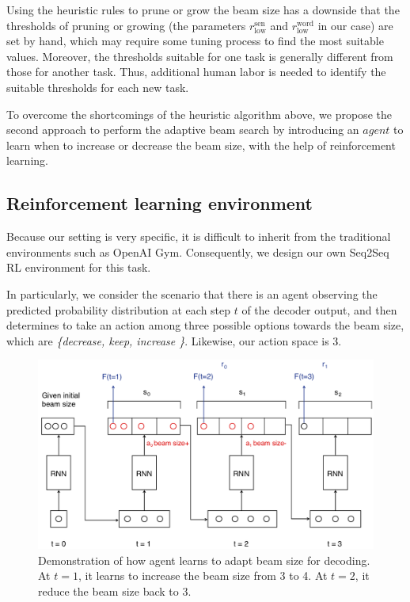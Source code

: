 \documentclass[11pt,a4paper]{article}
\begin{document}
Using the heuristic rules to prune or grow the beam size has a downside that the thresholds of pruning or growing (the parameters $r^{\textrm{sen}}_{\textrm{low}}$ and $r^{\textrm{word}}_{\textrm{low}}$ in our case) are set by hand, which may require some tuning process to find the most suitable values. Moreover, the thresholds suitable for one task is generally different from those for another task. Thus, additional human labor is needed to identify the suitable thresholds for each new task.

To overcome the shortcomings of the heuristic algorithm above, we propose the second approach to perform the adaptive beam search by introducing an $agent$ to learn when to increase or decrease the beam size, with the help of reinforcement learning.

\subsection{Reinforcement learning environment}
Because our setting is very specific, it is difficult to inherit from the traditional environments such as OpenAI Gym. Consequently, we design our own Seq2Seq RL environment for this task. 

In particularly, we consider the scenario that there is an agent observing the predicted probability distribution at each step $t$ of the decoder output, and then determines to take an action among three possible options towards the beam size, which are \textit{\{decrease, keep, increase \}}. Likewise, our action space is 3. 


\begin{figure}[ht]
\centering
\includegraphics[width=1.0\linewidth]{adapt.png}
\caption{Demonstration of how agent learns to adapt beam size for decoding. At $t=1$, it learns to increase the beam size from 3 to 4. At $t=2$, it reduce the beam size back to 3.}
\label{fig:adaptve}
\end{figure}
\end{document}
